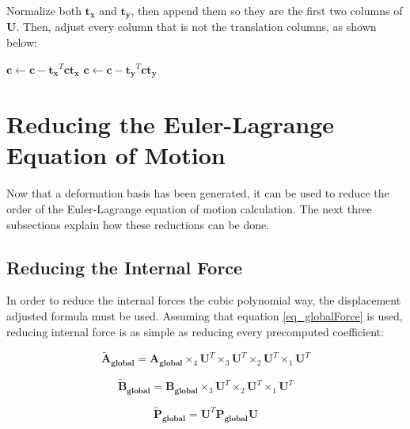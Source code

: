 \documentclass[twocolumn,10pt]{asme2ej}
\begin{document}
Normalize both $\bm{t_x}$ and $\bm{t_y}$, then append them so they are the first two columns of $\bm{U}$. Then, adjust every column that is not the translation columns, as shown below:

\begin{algorithmic}[1]
          \State $ \bm{c} \gets \bm{c} -  \bm{t_x}^T \bm{c} \bm{t_x}$
          \State $ \bm{c} \gets \bm{c} -  \bm{t_y}^T \bm{c} \bm{t_y}$
          \EndIf
        \EndFor
    \EndFunction
\end{algorithmic}

\section{Reducing the Euler-Lagrange Equation of Motion}

Now that a deformation basis has been generated, it can be used to reduce the order of the Euler-Lagrange equation of motion calculation. The next three subsections explain how these reductions can be done.

\subsection{Reducing the Internal Force}

In order to reduce the internal forces the cubic polynomial way, the displacement adjusted formula must be used. Assuming that equation \ref{eq_globalForce} is used, reducing internal force is as simple as reducing every precomputed coefficient:

\begin{equation}
  \bm{\tilde{A}_{global}} = \bm{A_{global}} \times_4 \bm{U}^T  \times_3 \bm{U}^T  \times_2 \bm{U}^T  \times_1 \bm{U}^T
\end{equation}

\begin{equation}
  \bm{\tilde{B}_{global}} = \bm{B_{global}} \times_3 \bm{U}^T  \times_2 \bm{U}^T  \times_1 \bm{U}^T
\end{equation}

\begin{equation}
  \bm{\tilde{P}_{global}} = \bm{U}^T \bm{P_{global}} \bm{U}
\end{equation}
\end{document}
